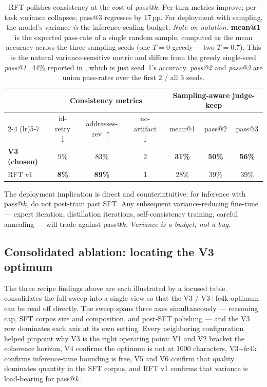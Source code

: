 \documentclass[11pt]{article}
\begin{document}
\begin{table}[ht]
\centering
\caption{RFT polishes consistency at the cost of pass@$k$. Per-turn metrics improve; per-task variance collapses; pass@3 regresses by 17\,pp. For deployment with sampling, the model's variance \emph{is} the inference-scaling budget. \textit{Note on notation.} \textbf{mean@1} is the expected pass-rate of a single random sample, computed as the mean accuracy across the three sampling seeds (one $T{=}0$ greedy + two $T{=}0.7$). This is the natural variance-sensitive metric and differs from the greedy single-seed \emph{pass@1}=44\% reported in , which is just seed~1's accuracy. \emph{pass@2} and \emph{pass@3} are union pass-rates over the first 2 / all 3 seeds.}
\label{tab:distill-rft}
\small
\begin{tabular}{lcccccc}
\toprule
& \multicolumn{3}{c}{Consistency metrics} & \multicolumn{3}{c}{Sampling-aware judge-keep} \\
\cmidrule(lr){2-4} \cmidrule(lr){5-7}
& id-retry $\downarrow$ & addresses-rev $\uparrow$ & no-artifact $\downarrow$ & mean@1 & pass@2 & pass@3 \\
\midrule
\textbf{V3 (chosen)} & 9\%  & 83\% & 2  & \textbf{31\%} & \textbf{50\%} & \textbf{56\%} \\
RFT v1               & \textbf{8\%}  & \textbf{89\%} & \textbf{1}  & 28\%   & 39\%   & 39\% \\
\bottomrule
\end{tabular}
\end{table}

The deployment implication is direct and counterintuitive: for inference with pass@$k$, do not post-train past SFT. Any subsequent variance-reducing fine-tune --- expert iteration, distillation iterations, self-consistency training, careful annealing --- will trade against pass@$k$. \emph{Variance is a budget, not a bug.}

\subsection{Consolidated ablation: locating the V3 optimum}
\label{sec:distill-ablation}

The three recipe findings above are each illustrated by a focused table.  consolidates the full sweep into a single view so that the V3 / V3+fc4k optimum can be read off directly. The sweep spans three axes simultaneously --- reasoning cap, SFT corpus size and composition, and post-SFT polishing --- and the V3 row dominates each axis at its own setting. Every neighboring configuration helped pinpoint why V3 is the right operating point: V1 and V2 bracket the coherence horizon, V4 confirms the optimum is not at 1000 characters, V3+fc4k confirms inference-time bounding is free, V5 and V6 confirm that quality dominates quantity in the SFT corpus, and RFT v1 confirms that variance is load-bearing for pass@$k$.
\end{document}
